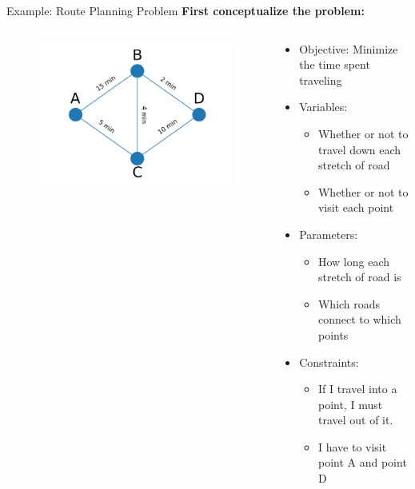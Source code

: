 \documentclass[10pt, aspectratio=169]{beamer}
\begin{document}
\begin{frame}{Example: Route Planning Problem}
    \textbf{First conceptualize the problem:}
    \begin{columns}
        \begin{column}{0.5\textwidth}
            \begin{figure}
                \includegraphics[width=\linewidth]{RoutePlanningProblem.png}
            \end{figure}
        \end{column}
        \begin{column}{0.5\textwidth}
            \begin{itemize}
                \item Objective: Minimize the time spent traveling
                \item Variables: 
                \begin{itemize}
                    \item Whether or not to travel down each stretch of road
                    \item Whether or not to visit each point
                \end{itemize}
                \item Parameters:
                \begin{itemize}
                    \item How long each stretch of road is
                    \item Which roads connect to which points
                \end{itemize}
                \item Constraints:
                \begin{itemize}
                    \item If I travel into a point, I must travel out of it.
                    \item I have to visit point A and point D
                \end{itemize}
            \end{itemize}
        \end{column}
    \end{columns}
\end{frame}
\end{document}
